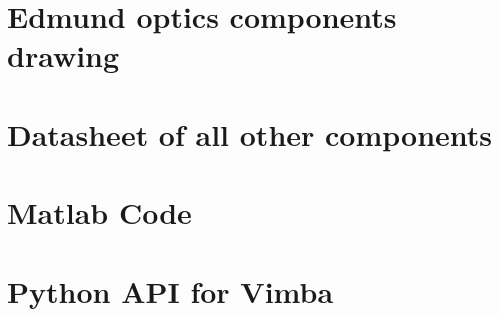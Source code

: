 \chapter{Edmund optics components drawing} \label{App:Edmund_MEP}

\newpage

\newpage

\newpage

\newpage

\newpage

\chapter{Datasheet of all other components}

\newpage

\chapter{Matlab Code} \label{App:Matlab}

\newpage

\newpage

\chapter{Python API for Vimba} \label{App:pythonVimba}

